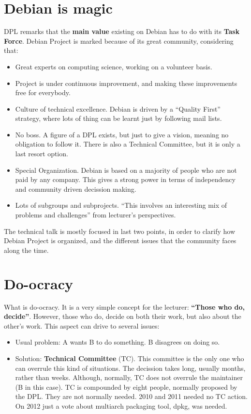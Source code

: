 \documentclass[11pt]{article}
\begin{document}
\section{Debian is magic}
DPL remarks that the \textbf{main value} existing on Debian has to do with its \textbf{Task Force}. Debian Project is marked because of its great community, considering that:
\begin{itemize}\itemsep0pt
\item{Great experts on computing science, working on a volunteer basis}.
\item{Project is under continuous improvement, and making these improvements free for everybody}.
\item{Culture of technical excellence.} Debian is driven by a ``Quality First'' strategy, where lots of thing can be learnt just by following mail lists.
\item{No boss.} A figure of a DPL exists, but just to give a vision, meaning no obligation to follow it. There is also a Technical Committee, but it is only a last resort option.
\item{Special Organization.} Debian is based on a majority of people who are not paid by any company. This gives a strong power in terms of independency and community driven decission making.
\item{Lots of subgroups and subprojects.} ``This involves an interesting mix of problems and challenges'' from lecturer's perspectives.
\end{itemize}
The technical talk is mostly focused in last two points, in order to clarify how Debian Project is organized, and the different issues that the community faces along the time.

\section{Do-ocracy}
What is do-ocracy. It is a very simple concept for the lecturer: \textbf{``Those who do, decide''}. However, those who do, decide on both their work, but also about the other's work. This aspect can drive to several issues:
\begin{itemize}\itemsep0pt
\item{Usual problem}: A wants B to do something. B disagrees on doing so.
\item{Solution}: \textbf{Technical Committee} (TC). This committee is the only one who can overrule this kind of situations. The decission takes long, usually months, rather than weeks. Although, normally, TC does not overrule the maintainer (B in this case). TC is compounded by eight people, normally proposed by the DPL. They are not normally needed. 2010 and 2011 needed no TC action. On 2012 just a vote about multiarch packaging tool, dpkg, was needed.
\end{itemize}
\end{document}
